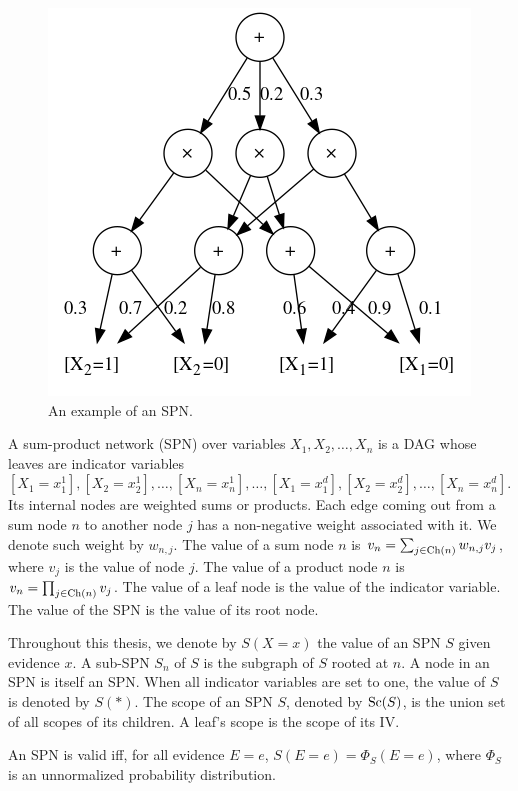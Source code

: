 \begin{figure}[h]
  \centering\includegraphics[scale=0.6]{graphs/sample_spn.png}
  \caption{An example of an SPN.\label{fig:sample_spn}}
\end{figure}

\begin{definition}
  A sum-product network (SPN) over variables $X_1,X_2,\ldots,X_n$ is a DAG whose leaves are
  indicator variables $[X_1=x_1^1],[X_2=x_2^1],\ldots,[X_n=x_n^1],\ldots,[X_1=x_1^d],[X_2=x_2^d],
  \ldots,[X_n=x_n^d]$. Its internal nodes are weighted sums or products. Each edge coming out from
  a sum node $n$ to another node $j$ has a non-negative weight associated with it. We denote such
  weight by $w_{n,j}$. The value of a sum node $n$ is $v_n=\sum_{j\in\operatorname*{\text{Ch}}(n)}w_{n,j}v_j$, where
  $v_j$ is the value of node $j$. The value of a product node $n$ is $v_n=\prod_{j\in\operatorname*{\text{Ch}}(n)}v_j$.
  The value of a leaf node is the value of the indicator variable. The value of the SPN is the
  value of its root node.
\end{definition}

Throughout this thesis, we denote by $S(X=x)$ the value of an SPN $S$ given evidence $x$. A sub-SPN
$S_n$ of $S$ is the subgraph of $S$ rooted at $n$. A node in an SPN is itself an SPN\@. When all
indicator variables are set to one, the value of $S$ is denoted by $S(\ast)$. The scope of an SPN
$S$, denoted by $\operatorname*{\text{Sc}}(S)$, is the union set of all scopes of its children. A leaf's scope is the
scope of its IV\@.

\begin{definition}[Validity]
  An SPN is valid iff, for all evidence $E=e$, $S(E=e)=\Phi_S(E=e)$, where $\Phi_S$ is an
  unnormalized probability distribution.
\end{definition}

